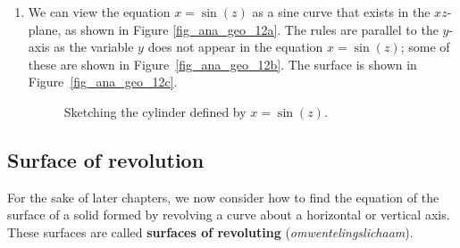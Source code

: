 \begin{example}
\begin{enumerate}[align=left]
	
	\item		We can view the equation $x=\sin(z)$ as a sine curve that exists in the $xz$-plane, as shown in Figure \ref{fig_ana_geo_12a}. The rules are parallel to the $y$-axis as the variable $y$ does not appear in the equation $x=\sin(z)$; some of these are shown in Figure~\ref{fig_ana_geo_12b}. The surface is shown in Figure~\ref{fig_ana_geo_12c}. 

\begin{figure}[H]
\centering
\centerline{
\hspace{0.1cm}
\hspace{0.1cm}
}
\caption{Sketching the cylinder defined by $x=\sin(z)$.}
\end{figure}


\end{enumerate}
\end{example}

\ifanalysis
\subsection{Surface of revolution}
For the sake of later chapters, we now consider how to find the equation of the surface of a solid  formed by revolving a curve about a horizontal or vertical axis. These surfaces are called \textbf{surfaces of revoluting} (\textit{omwentelingslichaam}).  

